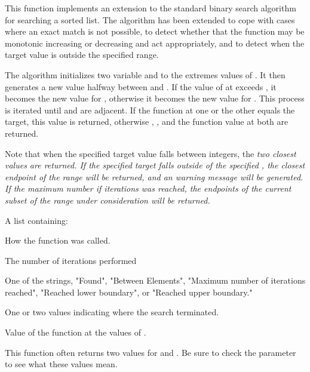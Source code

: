 \begin{Details}\relax
This function implements an extension to the standard binary search
algorithm for searching a sorted list.  The algorithm has been
extended to cope with cases where an exact match is not possible, to
detect whether that the function may be monotonic increasing or
decreasing and act appropriately, and to detect when the target value
is outside the specified range.

The algorithm initializes two variable  and
 to the extremes values of .  It then generates
a new value  halfway between  and .  If
the value of  at  exceeds , it
becomes the new value for , otherwise it becomes the new
value for .  This process is iterated until  and
 are adjacent.  If the function at one or the other equals
the target, this value is returned, otherwise , ,
and the function value at both are returned.

Note that when the specified target value falls between integers, the
\em{two} closest values are returned.  If the specified target falls
outside of the specified , the closest endpoint of the
range will be returned, and an warning message will be generated.  If
the maximum number if iterations was reached, the endpoints of the
current subset of the range under consideration will be returned.
\end{Details}
\begin{Value}
A list containing:
\begin{ldescription}
\item[\code{call}] How the function was called.
\item[\code{numiter}] The number of iterations performed
\item[\code{flag }] One of the strings,  "Found", "Between Elements",
"Maximum number of iterations reached", "Reached lower boundary", or
"Reached upper boundary."
\item[\code{where}] One or two values indicating where the search
terminated.
\item[\code{value}] Value of the function  at the values of
.
\end{ldescription}
\end{Value}
\begin{Note}\relax
This function often returns two values for  and
.  Be sure to check the  parameter to see what
these values mean.
\end{Note}
